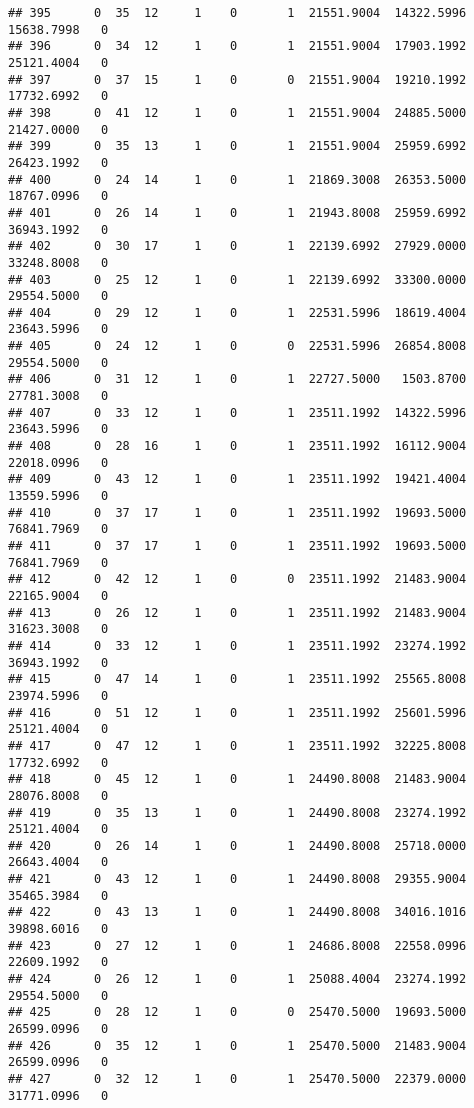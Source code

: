 \documentclass[
]{article}
\begin{document}
\begin{enumerate}
\begin{verbatim}
## 395      0  35  12     1    0       1  21551.9004  14322.5996  15638.7998   0
## 396      0  34  12     1    0       1  21551.9004  17903.1992  25121.4004   0
## 397      0  37  15     1    0       0  21551.9004  19210.1992  17732.6992   0
## 398      0  41  12     1    0       1  21551.9004  24885.5000  21427.0000   0
## 399      0  35  13     1    0       1  21551.9004  25959.6992  26423.1992   0
## 400      0  24  14     1    0       1  21869.3008  26353.5000  18767.0996   0
## 401      0  26  14     1    0       1  21943.8008  25959.6992  36943.1992   0
## 402      0  30  17     1    0       1  22139.6992  27929.0000  33248.8008   0
## 403      0  25  12     1    0       1  22139.6992  33300.0000  29554.5000   0
## 404      0  29  12     1    0       1  22531.5996  18619.4004  23643.5996   0
## 405      0  24  12     1    0       0  22531.5996  26854.8008  29554.5000   0
## 406      0  31  12     1    0       1  22727.5000   1503.8700  27781.3008   0
## 407      0  33  12     1    0       1  23511.1992  14322.5996  23643.5996   0
## 408      0  28  16     1    0       1  23511.1992  16112.9004  22018.0996   0
## 409      0  43  12     1    0       1  23511.1992  19421.4004  13559.5996   0
## 410      0  37  17     1    0       1  23511.1992  19693.5000  76841.7969   0
## 411      0  37  17     1    0       1  23511.1992  19693.5000  76841.7969   0
## 412      0  42  12     1    0       0  23511.1992  21483.9004  22165.9004   0
## 413      0  26  12     1    0       1  23511.1992  21483.9004  31623.3008   0
## 414      0  33  12     1    0       1  23511.1992  23274.1992  36943.1992   0
## 415      0  47  14     1    0       1  23511.1992  25565.8008  23974.5996   0
## 416      0  51  12     1    0       1  23511.1992  25601.5996  25121.4004   0
## 417      0  47  12     1    0       1  23511.1992  32225.8008  17732.6992   0
## 418      0  45  12     1    0       1  24490.8008  21483.9004  28076.8008   0
## 419      0  35  13     1    0       1  24490.8008  23274.1992  25121.4004   0
## 420      0  26  14     1    0       1  24490.8008  25718.0000  26643.4004   0
## 421      0  43  12     1    0       1  24490.8008  29355.9004  35465.3984   0
## 422      0  43  13     1    0       1  24490.8008  34016.1016  39898.6016   0
## 423      0  27  12     1    0       1  24686.8008  22558.0996  22609.1992   0
## 424      0  26  12     1    0       1  25088.4004  23274.1992  29554.5000   0
## 425      0  28  12     1    0       0  25470.5000  19693.5000  26599.0996   0
## 426      0  35  12     1    0       1  25470.5000  21483.9004  26599.0996   0
## 427      0  32  12     1    0       1  25470.5000  22379.0000  31771.0996   0

\end{verbatim}
\end{enumerate}
\end{document}
